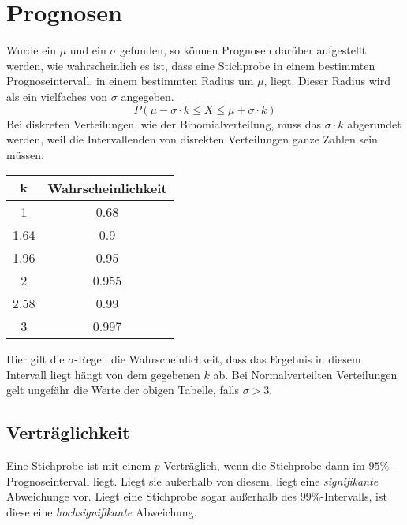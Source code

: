 \documentclass{article}
\begin{document}
 
\section{Prognosen} 
\begin{minipage}{\dimexpr\linewidth-6cm}
Wurde ein $\mu$ und ein $\sigma$ gefunden, so können Prognosen darüber aufgestellt werden, wie wahrscheinlich es ist, dass eine Stichprobe in einem bestimmten Prognoseintervall, in einem bestimmten Radius um $\mu$, liegt. Dieser Radius wird als ein vielfaches von $\sigma$ angegeben.
\[
 P(\mu-\sigma \cdot k \le X \le \mu+\sigma \cdot k) 
\]
Bei diskreten Verteilungen, wie der Binomialverteilung, muss das $\sigma \cdot k$ abgerundet werden, weil die Intervallenden von disrekten Verteilungen ganze Zahlen sein müssen. 
\end{minipage}
\hfill 
\begin{minipage}{6cm}
\begin{center}
\begin{tabular}{ |c|c| }
\hline
 $\mathbf{k}$ & \textbf{Wahrscheinlichkeit} \\
\hline
 1 & 0.68 \\
\hline
 1.64 & 0.9 \\
\hline
 1.96 & 0.95 \\
\hline
 2 & 0.955 \\
\hline
 2.58 & 0.99 \\
\hline
 3 & 0.997 \\
\hline
\end{tabular}
\end{center}
\end{minipage} 
 
\vspace*{0.3em} 
\noindent Hier gilt die $\sigma$-Regel: die Wahrscheinlichkeit, dass das Ergebnis in diesem Intervall liegt hängt von dem gegebenen $k$ ab. Bei Normalverteilten Verteilungen gelt ungefähr die Werte der obigen Tabelle, falls $\sigma > 3$.
 
\subsection{Verträglichkeit} 
Eine Stichprobe ist mit einem $p$ Verträglich, wenn die Stichprobe dann im $95\%$-Prognoseintervall liegt. Liegt sie außerhalb von diesem, liegt eine \emph{signifikante} Abweichunge vor. Liegt eine Stichprobe sogar außerhalb des $99\%$-Intervalls, ist diese eine \emph{hochsignifikante} Abweichung.
 
\end{document}
